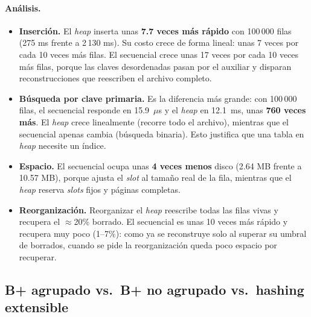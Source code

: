 \documentclass[11pt,a4paper]{article}
\begin{document}
\paragraph{Análisis.}
\begin{itemize}
  \item \textbf{Inserción.} El \emph{heap} inserta unas \textbf{7.7 veces más rápido} con 100\,000 filas (275 ms frente a 2\,130 ms). Su costo crece de forma lineal: unas 7 veces por cada 10 veces más filas. El secuencial crece unas 17 veces por cada 10 veces más filas, porque las claves desordenadas pasan por el auxiliar y disparan reconstrucciones que reescriben el archivo completo.
  \item \textbf{Búsqueda por clave primaria.} Es la diferencia más grande: con 100\,000 filas, el secuencial responde en 15.9~$\mu$s y el \emph{heap} en 12.1~ms, unas \textbf{760 veces más}. El \emph{heap} crece linealmente (recorre todo el archivo), mientras que el secuencial apenas cambia (búsqueda binaria). Esto justifica que una tabla en \emph{heap} necesite un índice.
  \item \textbf{Espacio.} El secuencial ocupa unas \textbf{4 veces menos} disco (2.64 MB frente a 10.57 MB), porque ajusta el \emph{slot} al tamaño real de la fila, mientras que el \emph{heap} reserva \emph{slots} fijos y páginas completas.
  \item \textbf{Reorganización.} Reorganizar el \emph{heap} reescribe todas las filas vivas y recupera el $\approx$20\% borrado. El secuencial es unas 10 veces más rápido y recupera muy poco (1--7\%): como ya se reconstruye solo al superar su umbral de borrados, cuando se pide la reorganización queda poco espacio por recuperar.
\end{itemize}

\subsection{B+ agrupado vs.\ B+ no agrupado vs.\ hashing extensible}
\label{sec:exp-indices}
\end{document}
